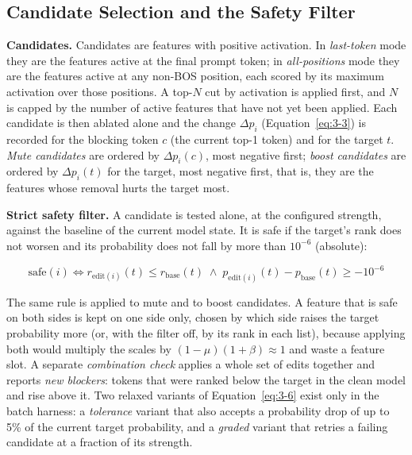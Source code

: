 \documentclass[12pt,a4paper]{report}
\begin{document}
\subsection{Candidate Selection and the Safety Filter}\label{sec:filter-def}

\textbf{Candidates.} Candidates are features with positive activation. In \textit{last-token} mode they are the features active at the final prompt token; in \textit{all-positions} mode they are the features active at any non-BOS position, each scored by its maximum activation over those positions. A top-$N$ cut by activation is applied first, and $N$ is capped by the number of active features that have not yet been applied. Each candidate is then ablated alone and the change $\Delta p_i$ (Equation~\ref{eq:3-3}) is recorded for the blocking token $c$ (the current top-1 token) and for the target $t$. \textit{Mute candidates} are ordered by $\Delta p_i(c)$, most negative first; \textit{boost candidates} are ordered by $\Delta p_i(t)$ for the target, most negative first, that is, they are the features whose removal hurts the target most.

\textbf{Strict safety filter.} A candidate is tested alone, at the configured strength, against the baseline of the current model state. It is safe if the target's rank does not worsen and its probability does not fall by more than $10^{-6}$ (absolute):

\begin{equation}
\text{safe}(i) \iff r_{\text{edit}(i)}(t) \le r_{\text{base}}(t) \;\wedge\; p_{\text{edit}(i)}(t) - p_{\text{base}}(t) \ge -10^{-6}
\label{eq:3-6}
\end{equation}

The same rule is applied to mute and to boost candidates. A feature that is safe on both sides is kept on one side only, chosen by which side raises the target probability more (or, with the filter off, by its rank in each list), because applying both would multiply the scales by $(1-\mu)(1+\beta) \approx 1$ and waste a feature slot. A separate \textit{combination check} applies a whole set of edits together and reports \textit{new blockers}: tokens that were ranked below the target in the clean model and rise above it. Two relaxed variants of Equation~\ref{eq:3-6} exist only in the batch harness: a \textit{tolerance} variant that also accepts a probability drop of up to 5\% of the current target probability, and a \textit{graded} variant that retries a failing candidate at a fraction of its strength.
\end{document}

